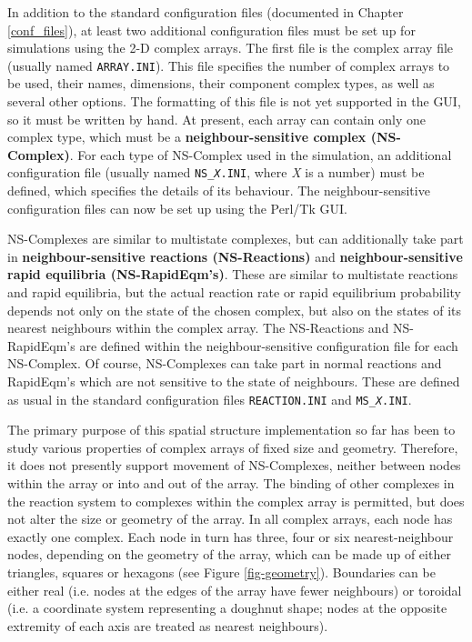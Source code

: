 In addition to the standard configuration files (documented in Chapter
\ref{conf_files}), at least two additional configuration files must be
set up for \stochsim{} simulations using the 2-D complex arrays.  The
first file is the complex array file (usually named
\texttt{ARRAY.INI}).  This file specifies the number of complex arrays
to be used, their names, dimensions, their component complex types, as
well as several other options.  The formatting of this file is not yet
supported in the GUI, so it must be written by hand.  At present, each
array can contain only one complex type, which must be a
\textbf{neighbour-sensitive complex (NS-Complex)}.  For each type of
NS-Complex used in the simulation, an additional configuration file
(usually named \texttt{NS\_\emph{X}.INI}, where \emph{X} is a number)
must be defined, which specifies the details of its behaviour.  The
neighbour-sensitive configuration files can now be set up using the
Perl/Tk GUI.

NS-Complexes are similar to multistate complexes, but can additionally
take part in \textbf{neighbour-sensitive reactions (NS-Reactions)} and
\textbf{neighbour-sensitive rapid equilibria (NS-RapidEqm's)}.  These
are similar to multistate reactions and rapid equilibria, but the
actual reaction rate or rapid equilibrium probability depends not only
on the state of the chosen complex, but also on the states of its
nearest neighbours within the complex array.  The NS-Reactions and
NS-RapidEqm's are defined within the neighbour-sensitive configuration
file for each NS-Complex.  Of course, NS-Complexes can take part in
normal \stochsim{} reactions and RapidEqm's which are not sensitive to
the state of neighbours.  These are defined as usual in the standard
configuration files \texttt{REACTION.INI} and
\texttt{MS\_\emph{X}.INI}.

The primary purpose of this spatial structure implementation so far
has been to study various properties of complex arrays of fixed size
and geometry.  Therefore, it does not presently support movement of
NS-Complexes, neither between nodes within the array or into and out
of the array.  The binding of other complexes in the reaction system
to complexes within the complex array is permitted, but does not alter
the size or geometry of the array.  In all complex arrays, each node
has exactly one complex.  Each node in turn has three, four or six
nearest-neighbour nodes, depending on the geometry of the array, which
can be made up of either triangles, squares or hexagons (see Figure
\ref{fig-geometry}).  Boundaries can be either real (i.e. nodes at
the edges of the array have fewer neighbours) or toroidal (i.e. a
coordinate system representing a doughnut shape; nodes at the opposite
extremity of each axis are treated as nearest neighbours).

